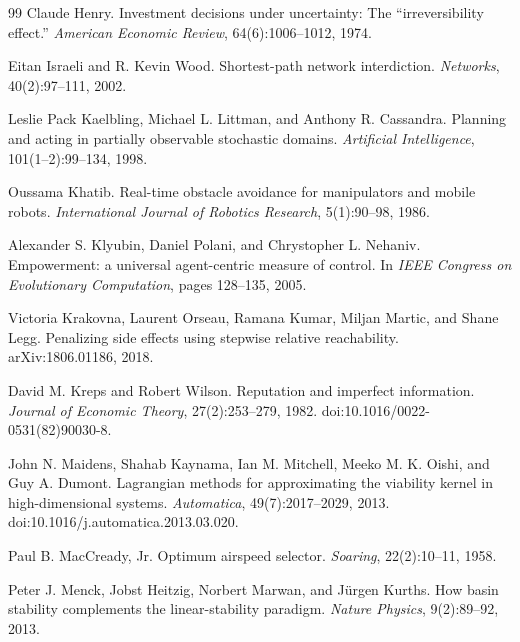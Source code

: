 \documentclass[11pt,a4paper]{article}
\theoremstyle{remark}
\begin{document}
\begin{thebibliography}{99}
Claude Henry.
\newblock Investment decisions under uncertainty: The ``irreversibility effect.''
\newblock \emph{American Economic Review}, 64(6):1006--1012, 1974.

Eitan Israeli and R. Kevin Wood.
\newblock Shortest-path network interdiction.
\newblock \emph{Networks}, 40(2):97--111, 2002.

Leslie Pack Kaelbling, Michael L. Littman, and Anthony R. Cassandra.
\newblock Planning and acting in partially observable stochastic domains.
\newblock \emph{Artificial Intelligence}, 101(1--2):99--134, 1998.

Oussama Khatib.
\newblock Real-time obstacle avoidance for manipulators and mobile robots.
\newblock \emph{International Journal of Robotics Research}, 5(1):90--98, 1986.

Alexander S. Klyubin, Daniel Polani, and Chrystopher L. Nehaniv.
\newblock Empowerment: a universal agent-centric measure of control.
\newblock In \emph{IEEE Congress on Evolutionary Computation}, pages 128--135, 2005.

Victoria Krakovna, Laurent Orseau, Ramana Kumar, Miljan Martic, and Shane Legg.
\newblock Penalizing side effects using stepwise relative reachability.
\newblock arXiv:1806.01186, 2018.

David M. Kreps and Robert Wilson.
\newblock Reputation and imperfect information.
\newblock \emph{Journal of Economic Theory}, 27(2):253--279, 1982.
\newblock doi:10.1016/0022-0531(82)90030-8.

John N. Maidens, Shahab Kaynama, Ian M. Mitchell, Meeko M. K. Oishi, and Guy A. Dumont.
\newblock Lagrangian methods for approximating the viability kernel in high-dimensional systems.
\newblock \emph{Automatica}, 49(7):2017--2029, 2013.
\newblock doi:10.1016/j.automatica.2013.03.020.

Paul B. MacCready, Jr.
\newblock Optimum airspeed selector.
\newblock \emph{Soaring}, 22(2):10--11, 1958.

Peter J. Menck, Jobst Heitzig, Norbert Marwan, and J\"urgen Kurths.
\newblock How basin stability complements the linear-stability paradigm.
\newblock \emph{Nature Physics}, 9(2):89--92, 2013.


\end{thebibliography}
\end{document}
